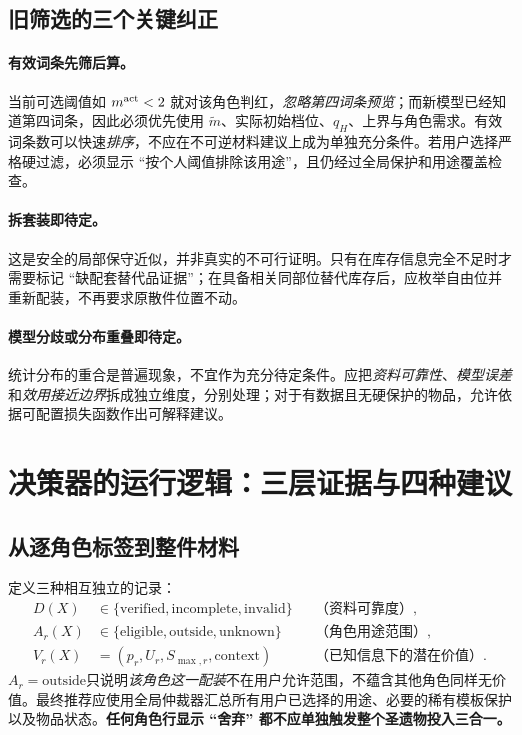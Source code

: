 \documentclass[11pt,a4paper]{ctexart}
\begin{document}
\subsection{旧筛选的三个关键纠正}
\paragraph{有效词条先筛后算。} 当前可选阈值如 $m^{\rm act}<2$ 就对该角色判红，\emph{忽略第四词条预览}；而新模型已经知道第四词条，因此必须优先使用 $\widetilde m$、实际初始档位、$q_H$、上界与角色需求。有效词条数可以快速\emph{排序}，不应在不可逆材料建议上成为单独充分条件。若用户选择严格硬过滤，必须显示 ``按个人阈值排除该用途''，且仍经过全局保护和用途覆盖检查。
\paragraph{拆套装即待定。} 这是安全的局部保守近似，并非真实的不可行证明。只有在库存信息完全不足时才需要标记 ``缺配套替代品证据''；在具备相关同部位替代库存后，应枚举自由位并重新配装，不再要求原散件位置不动。
\paragraph{模型分歧或分布重叠即待定。} 统计分布的重合是普遍现象，不宜作为充分待定条件。应把\emph{资料可靠性}、\emph{模型误差}和\emph{效用接近边界}拆成独立维度，分别处理；对于有数据且无硬保护的物品，允许依据可配置损失函数作出可解释建议。

\section{决策器的运行逻辑：三层证据与四种建议}
\subsection{从逐角色标签到整件材料}
定义三种相互独立的记录：
\begin{align*}
D(X)&\in\{\mathrm{verified},\mathrm{incomplete},\mathrm{invalid}\}&&\text{（资料可靠度）},\\
A_r(X)&\in\{\mathrm{eligible},\mathrm{outside},\mathrm{unknown}\}&&\text{（角色用途范围）},\\
V_r(X)&=(p_r,U_r,S_{\max,r},\text{context})&&\text{（已知信息下的潜在价值）}.
\end{align*}
$A_r=\mathrm{outside}$只说明\emph{该角色这一配装}不在用户允许范围，不蕴含其他角色同样无价值。最终推荐应使用全局仲裁器汇总所有用户已选择的用途、必要的稀有模板保护以及物品状态。\textbf{任何角色行显示 ``舍弃'' 都不应单独触发整个圣遗物投入三合一。}
\end{document}
